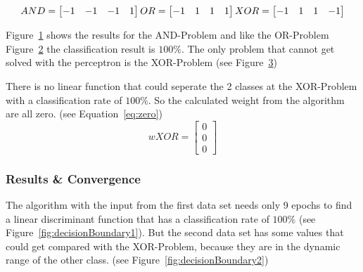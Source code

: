 \documentclass[subfigure,epsfig,fleqn,float,ausarbeitung]{scrartcl}
\begin{document}
\begin{equation}
AND = 
	\begin{bmatrix}
     -1  &   -1  &   -1   &  1
	\end{bmatrix}
	\\
OR = 
	\begin{bmatrix}
     -1  &   1  &   1   &  1
	\end{bmatrix}
	\\
XOR = 
	\begin{bmatrix}
     -1  &   1  &   1   &  -1
	\end{bmatrix}
	\label{eq:prob}
\end{equation}

Figure~\ref{fig:and} shows the results for the AND-Problem and like the OR-Problem Figure~\ref{fig:or} the classification result is $100\%$. The only problem that cannot get solved with the perceptron is the XOR-Problem (see Figure~\ref{fig:xor}) 

There is no linear function that could seperate the 2 classes at the XOR-Problem with a classification rate of $100\%$. So the calculated weight from the algorithm are all zero. (see Equation~\ref{eq:zero})
\begin{equation}
wXOR = 
	\begin{bmatrix}
    0\\0\\0
	\end{bmatrix}
	\label{eq:zero}
\end{equation}
\begin{figure}
	\centering
	\setlength\figureheight{6cm} 
	\setlength\figurewidth{8cm}
	
	\caption{}
	\label{fig:and}
\end{figure}
\begin{figure}
	\centering
	\setlength\figureheight{6cm} 
	\setlength\figurewidth{8cm}
	
	\caption{}
	\label{fig:or}
\end{figure}
\begin{figure}
	\centering
	\setlength\figureheight{6cm} 
	\setlength\figurewidth{8cm}
	
	\caption{}
	\label{fig:xor}
\end{figure}


\subsubsection{Results \& Convergence}

The algorithm with the input from the first data set needs only 9 epochs to find a linear discriminant function that has a classification rate of $100\%$ (see Figure~\ref{fig:decisionBoundary1}). But the second data set has some values that could get compared with the XOR-Problem, because they are in the dynamic range of the other class. (see Figure~\ref{fig:decisionBoundary2})
\end{document}
